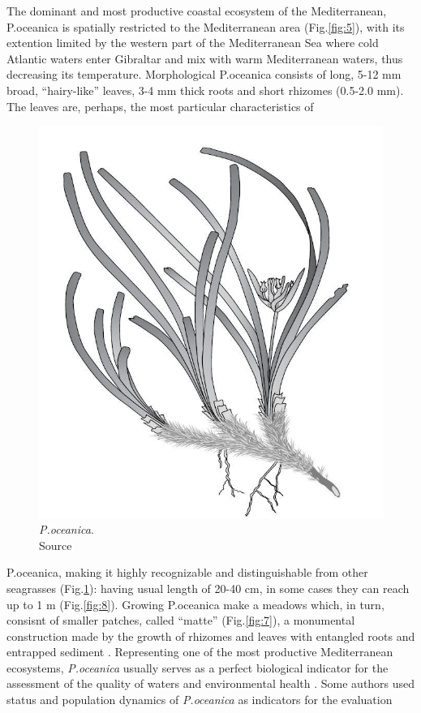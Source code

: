 \documentclass[10pt, a4paper]{article}
\begin{document}
The dominant and most productive coastal ecosystem of the Mediterranean, P.oceanica is
spatially restricted to the Mediterranean area (Fig.\ref{fig:5}), with its extention limited by the western part
of the Mediterranean Sea where cold Atlantic waters enter Gibraltar and mix with warm
Mediterranean waters, thus decreasing its temperature.
Morphological P.oceanica consists of long, 5-12 mm broad, “hairy-like” leaves, 3-4 mm thick roots
and short rhizomes (0.5-2.0 mm). The leaves are, perhaps, the most particular characteristics of

\begin{figure}
\centering
\includegraphics[scale=0.15]{Fig-1-6.jpg}
\caption{\textit{P.oceanica}.\\
Source \cite{Luque04}\label{Luque04}}
\label{fig:6}
\end{figure}

P.oceanica, making it highly recognizable and distinguishable from other seagrasses (Fig.\ref{fig:6}): having
usual length of 20-40 cm, in some cases they can reach up to 1 m \cite{Borum04}\label{Borum04}  (Fig.\ref{fig:8}).
Growing P.oceanica make a meadows which, in turn, consisnt of smaller patches, called “matte”
(Fig.\ref{fig:7}), a monumental construction made by the growth of rhizomes and leaves with entangled roots
and entrapped sediment \cite{Francour06}\label{Francour06}.
Representing one of the most productive Mediterranean ecosystems, \textit{P.oceanica} usually serves as a
perfect biological indicator for the assessment of the quality of waters and environmental health
\cite{Boudouresque89}\label{Boudouresque89}. Some authors \cite{Guidetti08,Montefalcone09}\label{Guidetti08} \label{Montefalcone09} used status and population dynamics of \textit{P.oceanica} as indicators for the evaluation
\end{document}
